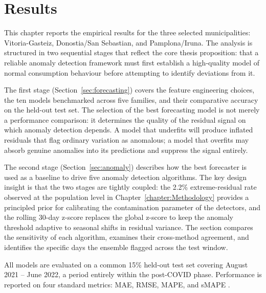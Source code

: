 ﻿\documentclass[12pt,reqno, twoside]{amsbook}
\numberwithin{figure}{chapter}
\numberwithin{table}{chapter}
\numberwithin{equation}{chapter}
\theoremstyle{plain}
\numberwithin{equation}{chapter}
\numberwithin{section}{chapter}
\begin{document}

\chapter{Results}
\label{chapter:results}

This chapter reports the empirical results for the three selected municipalities: Vitoria-Gasteiz, Donostia/San Sebastian, and Pamplona/Iruna. The analysis is structured in two sequential stages that reflect the core thesis proposition: that a reliable anomaly detection framework must first establish a high-quality model of normal consumption behaviour before attempting to identify deviations from it.

The first stage (Section~\ref{sec:forecasting}) covers the feature engineering choices, the ten models benchmarked across five families, and their comparative accuracy on the held-out test set. The selection of the best forecasting model is not merely a performance comparison: it determines the quality of the residual signal on which anomaly detection depends. A model that underfits will produce inflated residuals that flag ordinary variation as anomalous; a model that overfits may absorb genuine anomalies into its predictions and suppress the signal entirely.

The second stage (Section~\ref{sec:anomaly}) describes how the best forecaster is used as a baseline to drive five anomaly detection algorithms. The key design insight is that the two stages are tightly coupled: the 2.2\% extreme-residual rate observed at the population level in Chapter~\ref{chapter:Methodology} provides a principled prior for calibrating the contamination parameter of the detectors, and the rolling 30-day z-score replaces the global z-score to keep the anomaly threshold adaptive to seasonal shifts in residual variance. The section compares the sensitivity of each algorithm, examines their cross-method agreement, and identifies the specific days the ensemble flagged across the test window.

All models are evaluated on a common 15\% held-out test set covering August 2021 -- June 2022, a period entirely within the post-COVID phase. Performance is reported on four standard metrics: \ac{MAE}, \ac{RMSE}, \ac{MAPE}, and \ac{sMAPE} \cite{mao_research_2024, hernandez_detection_2024}.
\end{document}
